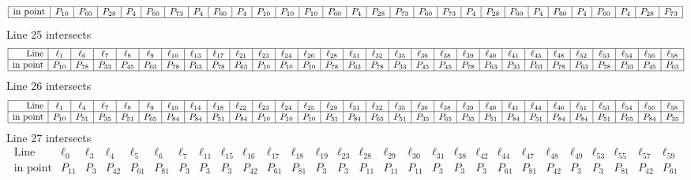 \documentclass{article}
\begin{document}
{$$\begin{array}{|r*{28}{|c}|}
\hline
\mbox{in point}  & P_{10} & P_{60} & P_{28} & P_{4} & P_{60} & P_{73} & P_{4} & P_{60} & P_{4} & P_{10} & P_{10} & P_{10} & P_{60} & P_{4} & P_{28} & P_{73} & P_{60} & P_{73} & P_{4} & P_{28} & P_{60} & P_{4} & P_{60} & P_{4} & P_{60} & P_{4} & P_{28} & P_{73}\\
\hline
\end{array}
$$
Line 25 intersects 
$$
\begin{array}{|r*{28}{|c}|}
\hline
\mbox{Line}  & \ell_{1} & \ell_{6} & \ell_{7} & \ell_{8} & \ell_{9} & \ell_{10} & \ell_{13} & \ell_{17} & \ell_{21} & \ell_{23} & \ell_{24} & \ell_{26} & \ell_{28} & \ell_{31} & \ell_{32} & \ell_{35} & \ell_{36} & \ell_{38} & \ell_{39} & \ell_{40} & \ell_{41} & \ell_{45} & \ell_{48} & \ell_{52} & \ell_{53} & \ell_{54} & \ell_{56} & \ell_{58}\\
\hline
\mbox{in point}  & P_{10} & P_{78} & P_{33} & P_{45} & P_{63} & P_{78} & P_{63} & P_{78} & P_{63} & P_{10} & P_{10} & P_{10} & P_{78} & P_{63} & P_{78} & P_{33} & P_{45} & P_{45} & P_{78} & P_{63} & P_{33} & P_{63} & P_{78} & P_{63} & P_{78} & P_{33} & P_{45} & P_{63}\\
\hline
\end{array}
$$
Line 26 intersects 
$$
\begin{array}{|r*{28}{|c}|}
\hline
\mbox{Line}  & \ell_{1} & \ell_{4} & \ell_{7} & \ell_{8} & \ell_{9} & \ell_{10} & \ell_{14} & \ell_{18} & \ell_{22} & \ell_{23} & \ell_{24} & \ell_{25} & \ell_{29} & \ell_{31} & \ell_{32} & \ell_{35} & \ell_{36} & \ell_{38} & \ell_{39} & \ell_{40} & \ell_{41} & \ell_{44} & \ell_{46} & \ell_{51} & \ell_{53} & \ell_{54} & \ell_{56} & \ell_{58}\\
\hline
\mbox{in point}  & P_{10} & P_{51} & P_{35} & P_{51} & P_{65} & P_{84} & P_{84} & P_{51} & P_{84} & P_{10} & P_{10} & P_{10} & P_{51} & P_{84} & P_{65} & P_{51} & P_{35} & P_{65} & P_{35} & P_{51} & P_{84} & P_{51} & P_{84} & P_{84} & P_{51} & P_{65} & P_{84} & P_{35}\\
\hline
\end{array}
$$
Line 27 intersects 
$$
\begin{array}{|r*{27}{|c}|}
\hline
\mbox{Line}  & \ell_{0} & \ell_{3} & \ell_{4} & \ell_{5} & \ell_{6} & \ell_{7} & \ell_{11} & \ell_{15} & \ell_{16} & \ell_{17} & \ell_{18} & \ell_{19} & \ell_{23} & \ell_{28} & \ell_{29} & \ell_{30} & \ell_{31} & \ell_{38} & \ell_{42} & \ell_{44} & \ell_{47} & \ell_{48} & \ell_{49} & \ell_{53} & \ell_{55} & \ell_{57} & \ell_{59}\\
\hline
\mbox{in point}  & P_{11} & P_{3} & P_{42} & P_{61} & P_{81} & P_{3} & P_{3} & P_{3} & P_{42} & P_{61} & P_{81} & P_{3} & P_{3} & P_{11} & P_{11} & P_{11} & P_{3} & P_{3} & P_{3} & P_{61} & P_{81} & P_{42} & P_{3} & P_{3} & P_{81} & P_{42} & P_{61}\\

\end{array}$$}
\end{document}
